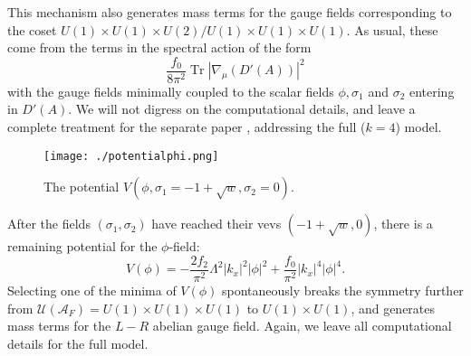 \documentclass[preprint]{revtex4}
\begin{document}
This mechanism also generates mass terms for the gauge fields corresponding to the coset  $U(1) \times U(1) \times U(2)/U(1) \times U(1) \times U(1)$. As usual, these come from the terms in the spectral action of the form
$$
\frac{f_0}{8 \pi^2} \operatorname{Tr} \left|\nabla_\mu (D'(A)) \right|^2
$$
with the gauge fields minimally coupled to the scalar fields $\phi, \sigma_1$ and $\sigma_2$ entering in $D'(A)$. We will not digress on the computational details, and leave a complete treatment for the separate paper \cite{ncgps}, addressing the full ($k=4$) model.

\begin{figure}
\begin{center}
\texttt{[image: ./potentialphi.png]}
\end{center}
\caption{The potential $V(\phi,\sigma_1=-1+\sqrt{w},\sigma_2=0)$.}
\label{fig:potentialphi}
\end{figure}

After the fields $(\sigma_1, \sigma_2)$ have reached their vevs $(-1+\sqrt{w},0)$, there is a remaining potential for the $\phi$-field:
$$
V(\phi) = -\frac{2 f_2}{ \pi^2 }\Lambda^2 |k_x|^2|\phi|^2 
 + \frac{f_0}{ \pi^2} |k_x|^4|\phi|^4.
$$
Selecting one of the minima of $V(\phi)$ spontaneously breaks the symmetry further from ${\mathcal{U}}({\mathcal{A}}_F)=U(1) \times U(1) \times U(1)$ to $U(1) \times U(1)$, and generates mass terms for the $L-R$ abelian gauge field. 
Again, we leave all computational details for the full model. 
\end{document}

